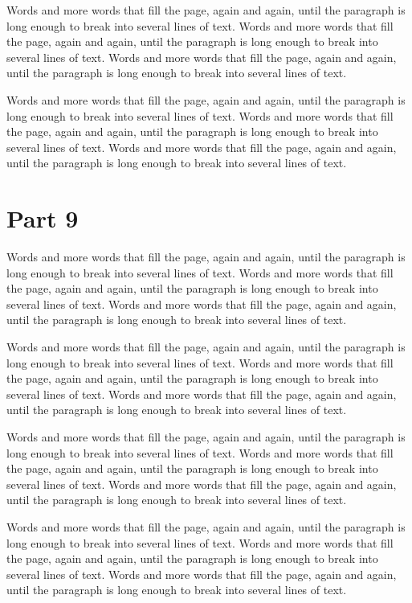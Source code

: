 \documentclass{article}
\begin{document}
Words and more words that fill the page, again and again, until the paragraph is long enough to break into several lines of text. Words and more words that fill the page, again and again, until the paragraph is long enough to break into several lines of text. Words and more words that fill the page, again and again, until the paragraph is long enough to break into several lines of text. 

Words and more words that fill the page, again and again, until the paragraph is long enough to break into several lines of text. Words and more words that fill the page, again and again, until the paragraph is long enough to break into several lines of text. Words and more words that fill the page, again and again, until the paragraph is long enough to break into several lines of text. 

\section{Part 9}
Words and more words that fill the page, again and again, until the paragraph is long enough to break into several lines of text. Words and more words that fill the page, again and again, until the paragraph is long enough to break into several lines of text. Words and more words that fill the page, again and again, until the paragraph is long enough to break into several lines of text. 

Words and more words that fill the page, again and again, until the paragraph is long enough to break into several lines of text. Words and more words that fill the page, again and again, until the paragraph is long enough to break into several lines of text. Words and more words that fill the page, again and again, until the paragraph is long enough to break into several lines of text. 

Words and more words that fill the page, again and again, until the paragraph is long enough to break into several lines of text. Words and more words that fill the page, again and again, until the paragraph is long enough to break into several lines of text. Words and more words that fill the page, again and again, until the paragraph is long enough to break into several lines of text. 

Words and more words that fill the page, again and again, until the paragraph is long enough to break into several lines of text. Words and more words that fill the page, again and again, until the paragraph is long enough to break into several lines of text. Words and more words that fill the page, again and again, until the paragraph is long enough to break into several lines of text. 
\end{document}
